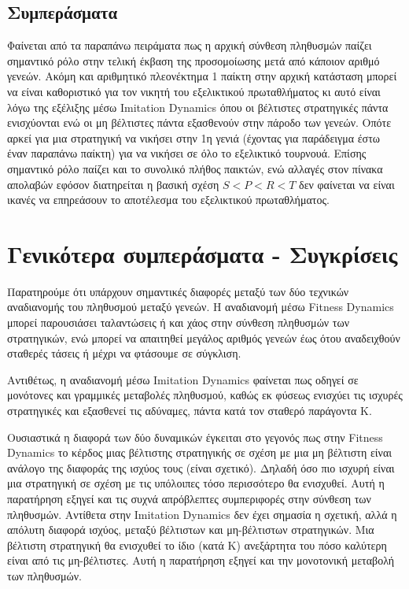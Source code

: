 \documentclass[12pt]{report}
\begin{document}
\subsection{Συμπεράσματα}
Φαίνεται από τα παραπάνω πειράματα πως η αρχική σύνθεση πληθυσμών παίζει σημαντικό ρόλο στην τελική έκβαση της προσομοίωσης μετά από κάποιον αριθμό γενεών. Ακόμη και αριθμητικό πλεονέκτημα 1 παίκτη στην αρχική κατάσταση μπορεί να είναι καθοριστικό για τον νικητή του εξελικτικού πρωταθλήματος κι αυτό είναι λόγω της εξέλιξης μέσω \foreignlanguage{english}{Imitation Dynamics} όπου οι βέλτιστες στρατηγικές πάντα ενισχύονται ενώ οι μη βέλτιστες πάντα εξασθενούν στην πάροδο των γενεών. Οπότε αρκεί για μια στρατηγική να νικήσει στην 1η γενιά (έχοντας για παράδειγμα έστω έναν παραπάνω παίκτη) για να νικήσει σε όλο το εξελικτικό τουρνουά.
Επίσης σημαντικό ρόλο παίζει και το συνολικό πλήθος παικτών, ενώ αλλαγές στον πίνακα απολαβών εφόσον διατηρείται η βασική σχέση $S<P<R<T$ δεν φαίνεται να είναι ικανές να επηρεάσουν το αποτέλεσμα του εξελικτικού πρωταθλήματος.


\section{Γενικότερα συμπεράσματα - Συγκρίσεις}
Παρατηρούμε ότι υπάρχουν σημαντικές διαφορές μεταξύ των δύο τεχνικών αναδιανομής του πληθυσμού μεταξύ γενεών. Η αναδιανομή μέσω \foreignlanguage{english}{Fitness Dynamics} μπορεί παρουσιάσει ταλαντώσεις ή και χάος στην σύνθεση πληθυσμών των στρατηγικών, ενώ μπορεί να απαιτηθεί μεγάλος αριθμός γενεών έως ότου αναδειχθούν σταθερές τάσεις ή μέχρι να φτάσουμε σε σύγκλιση.

Αντιθέτως, η αναδιανομή μέσω \foreignlanguage{english}{Imitation Dynamics} φαίνεται πως οδηγεί σε μονότονες και γραμμικές μεταβολές πληθυσμού, καθώς εκ φύσεως ενισχύει τις ισχυρές στρατηγικές και εξασθενεί τις αδύναμες, πάντα κατά τον σταθερό παράγοντα Κ.

Ουσιαστικά η διαφορά των δύο δυναμικών έγκειται στο γεγονός πως στην \foreignlanguage{english}{Fitness Dynamics} το κέρδος μιας βέλτιστης στρατηγικής σε σχέση με μια μη βέλτιστη είναι ανάλογο της διαφοράς της ισχύος τους (είναι σχετικό). Δηλαδή όσο πιο ισχυρή είναι μια στρατηγική σε σχέση με τις υπόλοιπες τόσο περισσότερο θα ενισχυθεί.
Αυτή η παρατήρηση εξηγεί και τις συχνά απρόβλεπτες συμπεριφορές στην σύνθεση των πληθυσμών.
Αντίθετα στην \foreignlanguage{english}{Imitation Dynamics} δεν έχει σημασία η σχετική, αλλά η απόλυτη διαφορά ισχύος, μεταξύ βέλτιστων και μη-βέλτιστων στρατηγικών. Μια βέλτιστη στρατηγική θα ενισχυθεί το ίδιο (κατά Κ) ανεξάρτητα του πόσο καλύτερη είναι από τις μη-βέλτιστες.
Αυτή η παρατήρηση εξηγεί και την μονοτονική μεταβολή των πληθυσμών.
\end{document}
